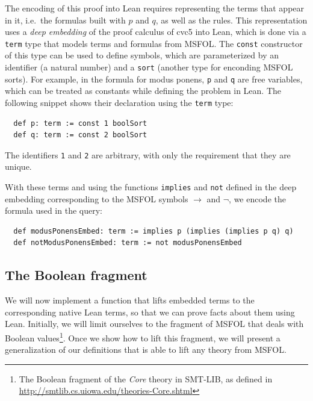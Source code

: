 The encoding of this proof into Lean requires representing the terms that appear
in it, i.e.\ the formulas built with $p$ and $q$, as well as the rules.
%
This representation uses a \emph{deep embedding} of the proof calculus of cvc5 into
Lean,
which is done via a \texttt{term} type that models terms and formulas from MSFOL.
The \texttt{const} constructor of this type can be used to define symbols,
which are parameterized by an identifier (a natural number) and a \texttt{sort}
(another type for enconding MSFOL sorts).
%
For example, in the formula for modus ponens, \texttt{p} and \texttt{q} are
free variables, which can be treated as constants while defining the problem in Lean.
The following snippet shows their declaration using the \texttt{term} type:

\begin{verbatim}
  def p: term := const 1 boolSort
  def q: term := const 2 boolSort
\end{verbatim}

The identifiers \texttt{1} and \texttt{2} are arbitrary, with only the
requirement that they are unique.

With these terms and using the functions \texttt{implies} and
\texttt{not} defined in the deep embedding corresponding to the MSFOL symbols
$\rightarrow$ and $\neg$, we encode the formula used in the
query:

\begin{verbatim}
  def modusPonensEmbed: term := implies p (implies (implies p q) q)
  def notModusPonensEmbed: term := not modusPonensEmbed
\end{verbatim}


\subsection{The Boolean fragment}

We will now implement a function that lifts embedded terms to the corresponding
native Lean terms, so that we can prove facts about them using Lean.
Initially, we will limit ourselves to the fragment of MSFOL that
deals with Boolean values\footnote{The Boolean fragment of the
\emph{Core} theory in SMT-LIB, as defined in
\url{http://smtlib.cs.uiowa.edu/theories-Core.shtml}}. Once
we show how to lift this fragment, we will present a generalization
of our definitions that is able to lift any theory from MSFOL.

